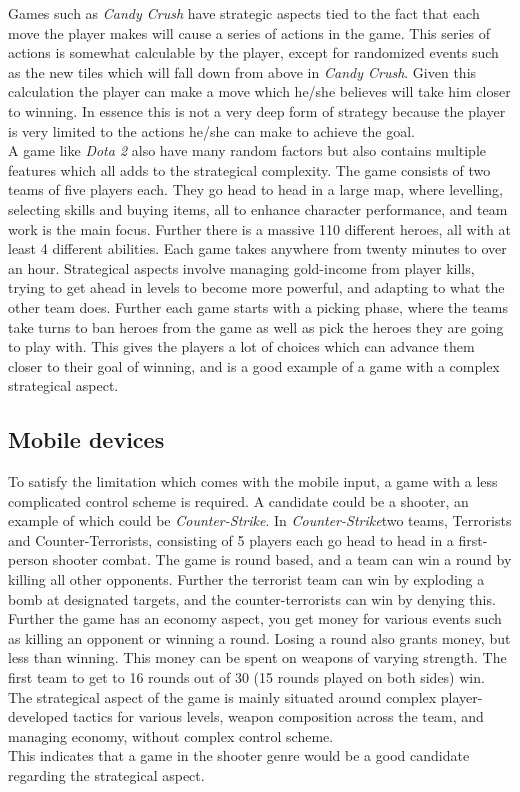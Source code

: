 Games such as \textit{Candy Crush}\cite{candycrush} have strategic aspects tied to the fact that each move the player makes will cause a series of actions in the game.
This series of actions is somewhat calculable by the player, except for randomized events such as the new tiles which will fall down from above in \textit{Candy Crush}.
Given this calculation the player can make a move which he/she believes will take him closer to winning.
In essence this is not a very deep form of strategy because the player is very limited to the actions he/she can make to achieve the goal.\\
A game like \textit{Dota 2}\cite{Dota2} also have many random factors but also contains multiple features which all adds to the strategical complexity.
The game consists of two teams of five players each. 
They go head to head in a large map, where levelling, selecting skills and buying items, all to enhance character performance, and team work is the main focus. 
Further there is a massive 110 different heroes, all with at least 4 different abilities. 
Each game takes anywhere from twenty minutes to over an hour. 
Strategical aspects involve managing gold-income from player kills, trying to get ahead in levels to become more powerful, and adapting to what the other team does. 
Further each game starts with a picking phase, where the teams take turns to ban heroes from the game as well as pick the heroes they are going to play with.
This gives the players a lot of choices which can advance them closer to their goal of winning, and is a good example of a game with a complex strategical aspect.

\subsection{Mobile devices}\label{sec:selectionofgametype:mobiledevices}
To satisfy the limitation which comes with the mobile input, a game with a less complicated control scheme is required.
A candidate could be a shooter, an example of which could be \textit{Counter-Strike}. \cite{counterstrike}
In \textit{Counter-Strike}two teams, Terrorists and Counter-Terrorists, consisting of 5 players each go head to head in a first-person shooter combat. 
The game is round based, and a team can win a round by killing all other opponents. 
Further the terrorist team can win by exploding a bomb at designated targets, and the counter-terrorists can win by denying this. 
Further the game has an economy aspect, you get money for various events such as killing an opponent or winning a round.
Losing a round also grants money, but less than winning.
This money can be spent on weapons of varying strength.
The first team to get to 16 rounds out of 30 (15 rounds played on both sides) win. 
The strategical aspect of the game is mainly situated around complex player-developed tactics for various levels, weapon composition across the team, and managing economy, without complex control scheme.\\
This indicates that a game in the shooter genre would be a good candidate regarding the strategical aspect.